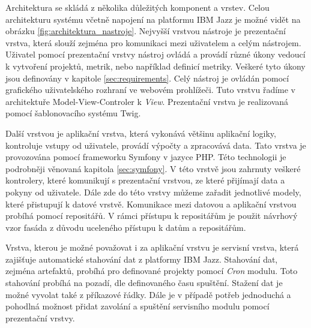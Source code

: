 \documentclass[czech,master]{diploma}
\begin{document}
Architektura se skládá z několika důležitých komponent a vrstev. Celou architekturu systému včetně napojení na platformu IBM Jazz je možné vidět na obrázku \ref{fig:architektura_nastroje}. Nejvyšší vrstvou nástroje je prezentační vrstva, která slouží zejména pro komunikaci mezi uživatelem a celým nástrojem. Uživatel pomocí prezentační vrstvy nástroj ovládá a provádí různé úkony vedoucí k vytvoření projektů, metrik, nebo například definicí metriky. Veškeré tyto úkony jsou definovány v kapitole \ref{sec:requirements}. Celý nástroj je ovládán pomocí grafického uživatelského rozhraní ve webovém prohlížeči. Tuto vrstvu řadíme v architektuře Model-View-Controler k \textit{View}. Prezentační vrstva je realizovaná pomocí šablonovacího systému Twig.

Další vrstvou je aplikační vrstva, která vykonává většinu aplikační logiky, kontroluje vstupy od uživatele, provádí výpočty a zpracovává data. Tato vrstva je provozována pomocí frameworku Symfony v jazyce PHP. Této technologii je podrobněji věnovaná kapitola \ref{sec:symfony}. V této vrstvě jsou zahrnuty veškeré kontrolery, které komunikují s prezentační vrstvou, ze které přijímají data a pokyny od uživatele. Dále zde do této vrstvy můžeme zařadit jednotlivé modely, které přistupují k datové vrstvě. Komunikace mezi datovou a aplikační vrstvou probíhá pomocí repositářů. V rámci přístupu k repositářům je použit návrhový vzor fasáda z důvodu uceleného přístupu k datům a repositářům.

Vrstva, kterou je možné považovat i za aplikační vrstvu je servisní vrstva, která zajišťuje automatické stahování dat z platformy IBM Jazz. Stahování dat, zejména artefaktů, probíhá pro definované projekty pomocí \textit{Cron} modulu. Toto stahování probíhá na pozadí, dle definovaného času spuštění. Stažení dat je možné vyvolat také z příkazové řádky. Dále je v případě potřeb jednoduchá a pohodlná možnost přidat zavolání a spuštění servisního modulu pomocí prezentační vrstvy.
\end{document}
